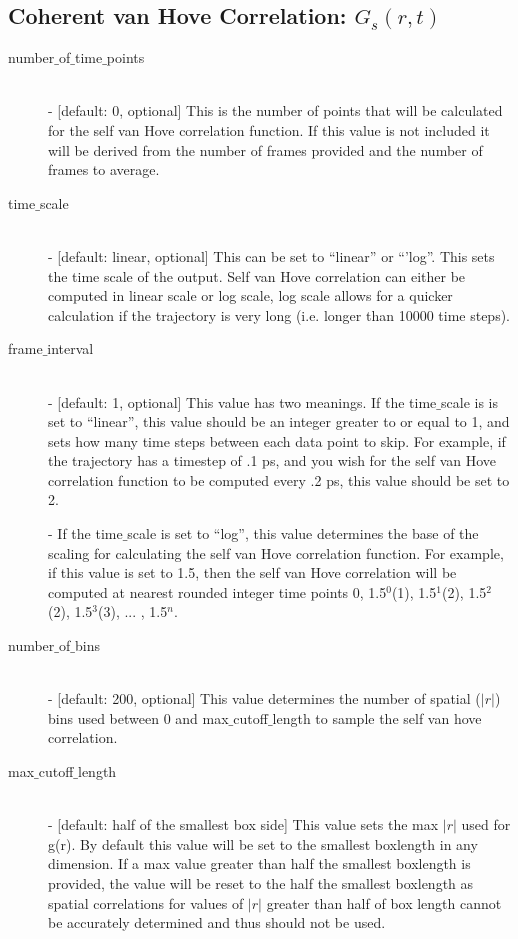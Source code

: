 \documentclass{article}
\begin{document}
\subsection{Coherent van Hove Correlation: $G_s(r,t)$} \label{sec::Grt_parm}
\begin{description}	
	\item[number$\_$of$\_$time$\_$points]\hfill \\
	- [default: 0, optional] This is the number of points that will be calculated for the self van Hove correlation function.  If this value is not included it will be derived from the number of frames provided and the number of frames to average.
	
	\item[time$\_$scale] \hfill \\
	- [default: linear, optional] This can be set to ``linear'' or ``'log''.  This sets the time scale of the output. Self van Hove correlation can either be computed in linear scale or log scale, log scale allows for a quicker calculation if the trajectory is very long (i.e. longer than 10000 time steps).
	
	\item[frame$\_$interval] \hfill \\
	- [default: 1, optional] This value has two meanings.  If the time$\_$scale is is set to ``linear'', this value should be an integer greater to or equal to 1, and sets how many time steps between each data point to skip.  For example, if the trajectory has a timestep of .1 ps, and you wish for the self van Hove correlation function to be computed every .2 ps, this value should be set to 2. 
	
	- If the time$\_$scale is set to ``log'', this value determines the base of the scaling for calculating the self van Hove correlation function.   For example, if this value is set to 1.5, then the self van Hove correlation will be computed at nearest rounded integer time points 0, 1.5$^0$(1), 1.5$^1$(2), 1.5$^2$(2), 1.5$^3$(3), ... , 1.5$^{n}$.
	
	\item[number$\_$of$\_$bins] \hfill \\
	- [default: 200, optional] This value determines the number of spatial ($|r|$) bins used between 0 and max$\_$cutoff$\_$length to sample the self van hove correlation.
	
	\item[max$\_$cutoff$\_$length] \hfill \\
	- [default: half of the smallest box side] This value sets the max $|r|$ used for g(r).  By default this value will be set to the smallest boxlength in any dimension.  If a max value greater than half the smallest boxlength is provided, the value will be reset to the half the smallest boxlength as spatial correlations for values of $|r|$ greater than half of box length cannot be accurately determined and thus should not be used.
\end{description}
\end{document}
